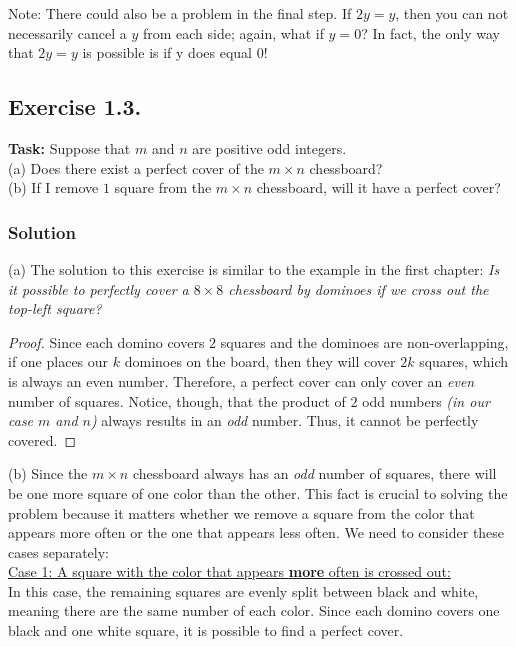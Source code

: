 \documentclass{article}
\begin{document}
Note: There could also be a problem in the final step. If $2y = y$, then you can not necessarily cancel a $y$
from each side; again, what if $y = 0$? In fact, the only way that $2y = y$ is possible is if y does equal $0$!


\subsection{Exercise 1.3.}
\textbf{Task:} Suppose that $m$ and $n$ are positive odd integers.\\
(a) Does there exist a perfect cover of the $m  \times n$ chessboard? \\
(b) If I remove $1$ square from the  $m \times n$  chessboard, will it have a perfect cover?

\subsubsection*{Solution}

(a) The solution to this exercise is similar to the example in the first chapter: \textit{Is it possible to perfectly cover a $8 \times 8$ chessboard by dominoes if we cross out the top-left square?}

\begin{proof} 
Since each domino covers $2$ squares and the dominoes are non-overlapping, if one places our $k$ dominoes on the board, then they will cover $2k$ squares, which is always an even number. Therefore, a perfect cover can only cover an \textit{even} number of squares. Notice, though, that the product of $2$ odd numbers \textit{(in our case $m$ and $n$)} always results in an \textit{odd} number. Thus, it cannot be perfectly covered.
\end{proof} 

\newpage

\noindent(b) Since the $m \times n$ chessboard always has an \textit{odd} number of squares, there will be one more square of one color than the other. This fact is crucial to solving the problem because it matters whether we remove a square from the color that appears more often or the one that appears less often. We need to consider these cases separately: \\

\underline{Case 1: A square with the color that appears \textbf{more} often is crossed out:}\\
In this case, the remaining squares are evenly split between black and white, meaning there are the same number of each color. Since each domino covers one black and one white square, it is possible to find a perfect cover.
\end{document}
